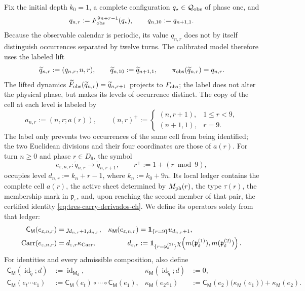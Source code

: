Fix the initial depth \(k_0=1\), a complete configuration
\(q_\star\in\mathcal Q_{\rm obs}\) of phase one, and
\[
 q_{n,r}:=F_{\rm obs}^{9n+r-1}(q_\star),\qquad
 q_{n,10}:=q_{n+1,1}.
\]
Because the observable calendar is periodic, its value \(q_{n,r}\) does not
by itself distinguish occurrences separated by twelve turns. The calibrated
model therefore uses the labeled lift
\[
 \widetilde q_{n,r}:=(q_{n,r},n,r),\qquad
 \widetilde q_{n,10}:=\widetilde q_{n+1,1},\qquad
 \pi_{\rm obs}(\widetilde q_{n,r})=q_{n,r}.
\]
The lifted dynamics
\(\widetilde F_{\rm obs}(\widetilde q_{n,r})
=\widetilde q_{n,r+1}\) projects to \(F_{\rm obs}\); the label does not alter the physical phase, but makes its
levels of occurrence distinct. The copy of the cell at each level is labeled by
\[
 a_{n,r}:=(n,r;a(r)),\qquad
 (n,r)^+:=
 \begin{cases}
  (n,r+1),&1\le r<9,\\
  (n+1,1),&r=9.
 \end{cases}
\]
The label only prevents two occurrences of the same cell from being
identified; the two Euclidean divisions and their four coordinates are those
of \(a(r)\). For turn \(n\ge0\) and phase \(r\in D_9\), the symbol
\[
 e_{\varepsilon,n,r}:\widetilde q_{n,r}
 \longrightarrow\widetilde q_{n,r+1},
 \qquad r^+:=1+(r\bmod9),
\]
occupies level \(d_{n,r}:=k_n+r-1\), where \(k_n:=k_0+9n\). Its local ledger
contains the complete cell \(a(r)\), the active sheet determined by
\(M_{\rm ph}(r)\), the type \(\tau(r)\), the membership mark in
\(\mathfrak p_\varepsilon\), and, upon reaching the second member of that
pair, the certified identity \eqref{eq:tres-carry-derivados-ch}. We define its
operators solely from that ledger:
\begin{align}
 \mathsf C_{\mathsf M}(e_{\varepsilon,n,r})
   &=\jmath_{d_{n,r}+1,d_{n,r}},&
 \kappa_{\mathsf M}(e_{\varepsilon,n,r})
   &=\mathbf1_{\{r=9\}}u_{d_{n,r}+1},
 \label{eq:memoria-arista-ch}\\
       \operatorname{Carr}(e_{\varepsilon,n,r})
   &=d_{\varepsilon,r}\kappa_{\rm Carr},&
 d_{\varepsilon,r}
   &:=\mathbf1_{\{r=\mathfrak p_\varepsilon^{(2)}\}}
       \chi\!\left(m(\mathfrak p_\varepsilon^{(1)}),
                    m(\mathfrak p_\varepsilon^{(2)})\right).
 \label{eq:carry-arista-derivado-ch}
\end{align}
For identities and every admissible composition, also define
\begin{align}
 \mathsf C_{\mathsf M}(\operatorname{id}_{\widetilde q};d)
   &:=\operatorname{id}_{\mathsf M_d},&
 \kappa_{\mathsf M}(\operatorname{id}_{\widetilde q};d)&:=0,
 \label{eq:memoria-identidad-ch}\\
 \mathsf C_{\mathsf M}(e_t\cdots e_1)
   &:=\mathsf C_{\mathsf M}(e_t)\circ\cdots\circ
      \mathsf C_{\mathsf M}(e_1),&
 \kappa_{\mathsf M}(e_2e_1)
   &:=\mathsf C_{\mathsf M}(e_2)
        \bigl(\kappa_{\mathsf M}(e_1)\bigr)
      +\kappa_{\mathsf M}(e_2).
 \label{eq:cociclo-memoria-calibrado-ch}
\end{align}
